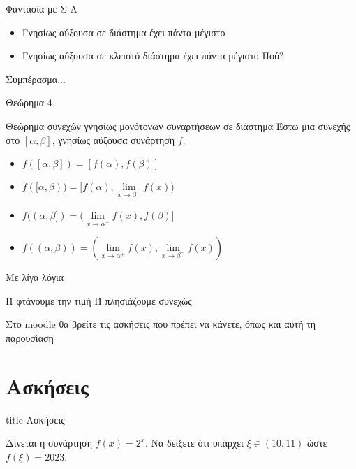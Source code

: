 \documentclass{presentation}
\begin{document}
\begin{frame}{Φαντασία με Σ-Λ}
  \begin{itemize}
    \item<1-> Γνησίως αύξουσα σε διάστημα έχει πάντα μέγιστο
    \item<2-> Γνησίως αύξουσα σε κλειστό διάστημα έχει πάντα μέγιστο  Πού?
  \end{itemize}
  Συμπέρασμα...
\end{frame}

\begin{frame}{Θεώρημα 4}
  \begin{block}{Θεώρημα συνεχών γνησίως μονότονων συναρτήσεων σε διάστημα}
    Έστω μια συνεχής στο $[α,β]$, γνησίως αύξουσα συνάρτηση $f$.
    \begin{itemize}
      \item<1-> $f([α,β])=[f(α),f(β)]$
      \item<2-> $f([α,β))=[f(α),\lim\limits_{x \to β^-}{ f(x) })$
      \item<3-> $f((α,β])=(\lim\limits_{x \to α^+}{ f(x) },f(β)]$
      \item<4-> $f((α,β))=(\lim\limits_{x \to α^+}{ f(x) },\lim\limits_{x \to β^-}{ f(x) })$
    \end{itemize}
  \end{block}
  Με λίγα λόγια

  Ή φτάνουμε την τιμή Ή πλησιάζουμε συνεχώς
\end{frame}

\begin{frame}[noframenumbering]
  Στο moodle θα βρείτε τις ασκήσεις που πρέπει να κάνετε, όπως και αυτή τη παρουσίαση
\end{frame}

\section{Ασκήσεις}

\begin{frame}[noframenumbering]
  \vfill
  \centering
  \begin{beamercolorbox}[sep=8pt,center,shadow=true,rounded=true]{title}
    Ασκήσεις
  \end{beamercolorbox}
  \vfill
\end{frame}

\begin{askisi}
  Δίνεται η συνάρτηση $f(x)=2^x$. Να δείξετε ότι υπάρχει $ξ\in (10,11)$ ώστε $f(ξ)=2023$.

  \hyperlink{Λύση1}{}
\end{askisi}
\end{document}
